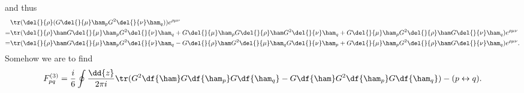 and thus
\begin{align*}
	 &\tr(\del{}{\rho}(G\del{}{\mu}\ham_{p}G^{2}\del{}{\nu}\ham_{q}))e^{\rho\mu\nu} \\
	=& \tr(\del{}{\rho}\ham G\del{}{\mu}\ham_{p}G^{2}\del{}{\nu}\ham_{q} + G\del{}{\mu}\ham_{p}G\del{}{\rho}\ham G^{2}\del{}{\nu}\ham_{q} + G\del{}{\mu}\ham_{p}G^{2}\del{}{\rho}\ham G\del{}{\nu}\ham_{q})e^{\rho\mu\nu} \\
	=& \tr(\del{}{\rho}\ham G\del{}{\mu}\ham_{p}G^{2}\del{}{\nu}\ham_{q} - G\del{}{\rho}\ham G^{2}\del{}{\mu}\ham_{q}G\del{}{\nu}\ham_{p} + G\del{}{\mu}\ham_{p}G^{2}\del{}{\rho}\ham G\del{}{\nu}\ham_{q})e^{\rho\mu\nu}.
\end{align*}
Somehow we are to find
\begin{align*}
	F^{(3)}_{pq} = \frac{i}{6}\oint\frac{\dd{z}}{2\pi i}\tr(G^{2}\df{\ham}G\df{\ham_{p}}G\df{\ham_{q}} - G\df{\ham}G^{2}\df{\ham_{p}}G\df{\ham_{q}}) - (p \leftrightarrow q).
\end{align*}

